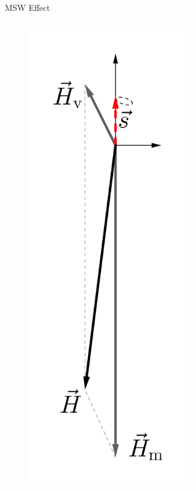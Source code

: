 \documentclass[9pt]{beamer}
\begin{document}
\begin{darkframes}
\begin{frame}{MSW Effect}
{\begin{columns}[T]
\begin{column}{0.33\textwidth}
\begin{figure}
    \centering
    \colorbox{white}{\includegraphics[width=0.7\textwidth]{assets/matter-effect-large-density}}
\end{figure}


\end{column}%
\begin{column}{0.33\textwidth}




\end{column}
\end{columns}}
\end{frame}
\end{darkframes}
\end{document}
